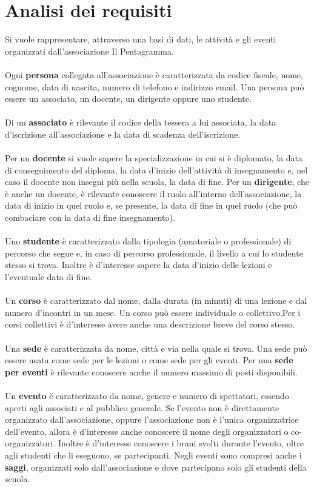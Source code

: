 \documentclass[12pt]{article}
\begin{document}
\section{Analisi dei requisiti}
	Si vuole rappresentare, attraverso una basi di dati, le attività e gli eventi organizzati dall'associazione Il Pentagramma.\\\\
	Ogni \textbf{persona} collegata all'associazione è caratterizzata da codice fiscale, nome, cognome, data di nascita, numero di telefono e indirizzo email. Una persona può essere un associato, un docente, un dirigente oppure uno studente.\\\\
	Di un \textbf{associato} è rilevante il codice della tessera a lui associata, la data d'iscrizione all'associazione e la data di scadenza dell'iscrizione.\\\\
	Per un \textbf{docente} si vuole sapere la specializzazione in cui si è diplomato, la data di conseguimento del diploma, la data d'inizio dell'attività di insegnamento e, nel caso il docente non insegni più nella scuola, la data di fine. Per un \textbf{dirigente}, che è anche un docente, è rilevante conoscere il ruolo all'interno dell'associazione, la data di inizio in quel ruolo e, se presente, la data di fine in quel ruolo (che può combaciare con la data di fine insegnamento).\\\\
	Uno \textbf{studente} è caratterizzato dalla tipologia (amatoriale o professionale) di percorso che segue e, in caso di percorso professionale, il livello a cui lo studente stesso si trova. Inoltre è d'interesse sapere la data d'inizio delle lezioni e l'eventuale data di fine.\\\\
	Un \textbf{corso} è caratterizzato dal nome, dalla durata (in minuti) di una lezione e dal numero d'incontri in un mese. Un corso può essere individuale o collettivo.Per i corsi collettivi è d'interesse avere anche una descrizione breve del corso stesso.\\\\
	Una \textbf{sede} è caratterizzata da nome, città e via nella quale si trova. Una sede può essere usata come sede per le lezioni o come sede per gli eventi. Per una \textbf{sede per eventi} è rilevante conoscere anche il numero massimo di posti disponibili.\\\\
	Un \textbf{evento} è caratterizzato da nome, genere e numero di spettatori, essendo aperti agli associati e al pubblico generale. Se l'evento non è direttamente organizzato dall'associazione, oppure l'associazione non è l'unica organizzatrice dell'evento, allora è d'interesse anche conoscere il nome degli organizzatori o co-organizzatori. Inoltre è d'interesse conoscere i brani svolti durante l'evento, oltre agli studenti che li eseguono, se partecipanti. Negli eventi sono compresi anche i \textbf{saggi}, organizzati solo dall'associazione e dove partecipano solo gli studenti della scuola.\\\\
\end{document}
